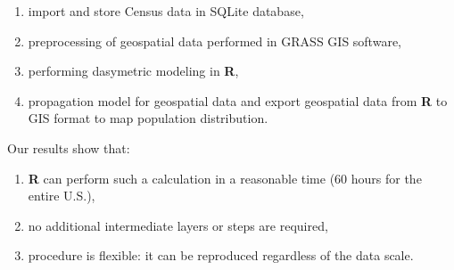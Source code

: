 \documentclass[\main/boa.tex]{subfiles}
\begin{document}
\begin{enumerate}
\def\labelenumi{\arabic{enumi}.}
\tightlist
\item
  import and store Census data in SQLite database,
\item
  preprocessing of geospatial data performed in GRASS GIS software,
\item
  performing dasymetric modeling in \textbf{R},
\item
  propagation model for geospatial data and export geospatial data from
  \textbf{R} to GIS format to map population distribution.
\end{enumerate}

Our results show that:

\begin{enumerate}
\def\labelenumi{\arabic{enumi}.}
\tightlist
\item
  \textbf{R} can perform such a calculation in a reasonable time (60
  hours for the entire U.S.),
\item
  no additional intermediate layers or steps are required,
\item
  procedure is flexible: it can be reproduced regardless of the data
  scale.
\end{enumerate}
\end{document}
